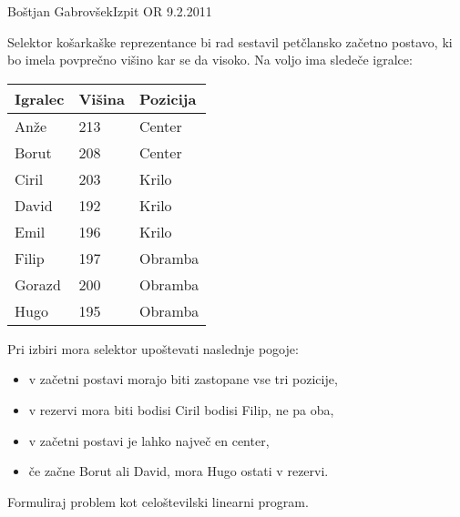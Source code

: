 \begin{naloga}{Boštjan Gabrovšek}{Izpit OR 9.2.2011}
\begin{vprasanje}
Selektor košarkaške reprezentance bi rad sestavil petčlansko začetno postavo, ki bo imela povprečno
višino kar se da visoko. Na voljo ima sledeče igralce:
\begin{center}
\begin{tabular}{lll}
Igralec & Višina & Pozicija \\ \hline
Anže    & 213    & Center   \\
Borut   & 208    & Center   \\
Ciril   & 203    & Krilo    \\
David   & 192    & Krilo    \\
Emil    & 196    & Krilo    \\
Filip   & 197    & Obramba  \\
Gorazd  & 200    & Obramba  \\
Hugo    & 195    & Obramba  \\
\end{tabular}
\end{center}
Pri izbiri mora selektor upoštevati naslednje pogoje:
\begin{itemize}
\item v začetni postavi morajo biti zastopane vse tri pozicije,
\item v rezervi mora biti bodisi Ciril bodisi Filip, ne pa oba,
\item v začetni postavi je lahko največ en center,
\item če začne Borut ali David, mora Hugo ostati v rezervi.
\end{itemize}
Formuliraj problem kot celoštevilski linearni program.
\end{vprasanje}
\begin{odgovor}
\end{odgovor}
\end{naloga}
